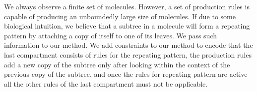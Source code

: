We always observe a finite set of molecules. However,
a set of production rules is capable of producing
an unboundedly large size of molecules.
If due to some biological intuition, we believe that a subtree in a molecule
will form a repeating pattern by attaching a copy of itself to
one of its leaves.
We pass such information to our method.
We add constraints to our method to encode that
the last compartment consists of rules for the repeating pattern,
the production rules add a new copy of the subtree only after looking
within the context of the previous copy of the subtree,
and once the rules for repeating pattern are active
all the other rules of the last compartment must not be applicable. 




